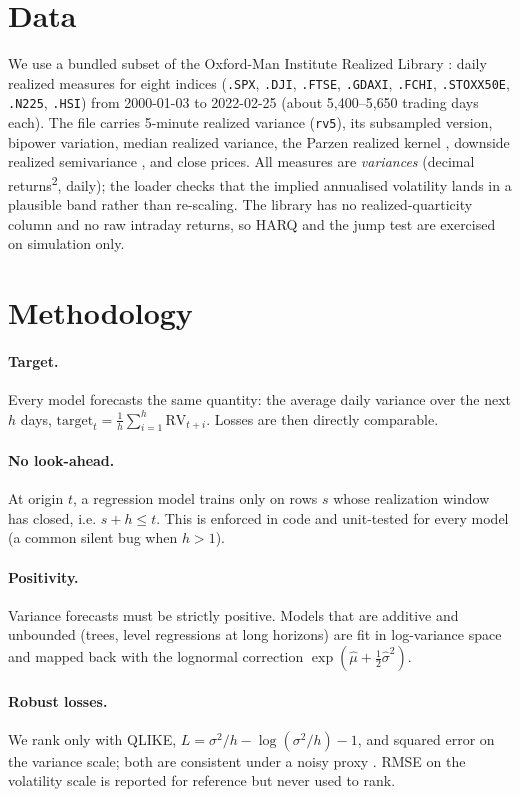 \documentclass[11pt]{article}
\begin{document}
\section{Data}
We use a bundled subset of the Oxford-Man Institute Realized Library \cite{omi2009}: daily
realized measures for eight indices (\texttt{.SPX}, \texttt{.DJI},
\texttt{.FTSE}, \texttt{.GDAXI}, \texttt{.FCHI}, \texttt{.STOXX50E},
\texttt{.N225}, \texttt{.HSI}) from 2000-01-03 to 2022-02-25 (about 5{,}400--5{,}650
trading days each). The file carries 5-minute realized variance (\texttt{rv5}),
its subsampled version, bipower variation, median realized variance, the Parzen
realized kernel \cite{bnhls2008}, downside realized semivariance \cite{ps2015}, and close prices. All measures
are \emph{variances} (decimal returns\textsuperscript{2}, daily); the loader
checks that the implied annualised volatility lands in a plausible band rather
than re-scaling. The library has no realized-quarticity column and no raw
intraday returns, so HARQ \cite{bpq2016} and the jump test \cite{abd2007} are exercised on simulation only.

\section{Methodology}
\paragraph{Target.} Every model forecasts the same quantity: the average
daily variance over the next $h$ days, $\text{target}_t = \frac{1}{h}\sum_{i=1}^{h}\text{RV}_{t+i}$.
Losses are then directly comparable.
\paragraph{No look-ahead.} At origin $t$, a regression model trains only on rows
$s$ whose realization window has closed, i.e. $s + h \le t$. This is enforced in
code and unit-tested for every model (a common silent bug when $h>1$).
\paragraph{Positivity.} Variance forecasts must be strictly positive. Models
that are additive and unbounded (trees, level regressions at long horizons) are
fit in log-variance space and mapped back with the lognormal correction
$\exp(\hat\mu + \tfrac12 \hat\sigma^2)$.
\paragraph{Robust losses.} We rank only with QLIKE,
$L = \sigma^2/h - \log(\sigma^2/h) - 1$, and squared error on the variance
scale; both are consistent under a noisy proxy \cite{patton2011}. RMSE on the
volatility scale is reported for reference but never used to rank.
\end{document}
